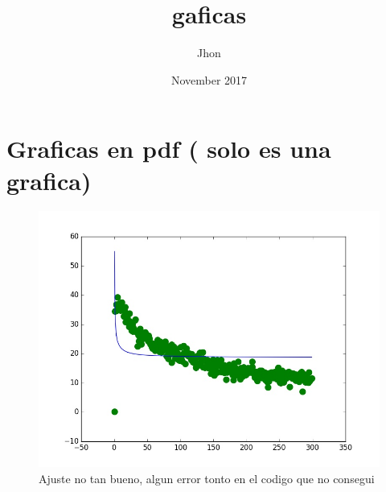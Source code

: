 \documentclass{article}
\title{gaficas}
\author{Jhon}
\date{November 2017}
\begin{document}
\maketitle

\section{Graficas en pdf ( solo es una grafica) }


\begin{figure}[]
\centering
\includegraphics[scale=0.5]{Plots.jpg}
\caption{Ajuste no tan bueno, algun error tonto en el codigo que no consegui }
\label{fig:1}
\end{figure}









\end{document}
